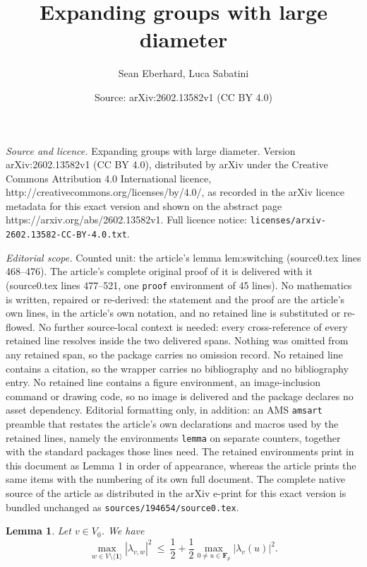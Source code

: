 \documentclass[10pt,a4paper]{amsart}
\title{Expanding groups with large diameter}
\author{Sean Eberhard, Luca Sabatini}
\date{Source: arXiv:2602.13582v1 (CC BY 4.0)}
\newtheorem{lemma}{Lemma}
\newcommand{\F}{\mathbf{F}}
\newcommand{\gen}[1]{\langle{#1}\rangle}
\def\one{\mathbf{1}}
\begin{document}
\maketitle

\noindent\emph{Source and licence.} Expanding groups with large diameter. Version arXiv:2602.13582v1 (CC BY 4.0), distributed by arXiv under the Creative Commons Attribution 4.0 International licence, http://creativecommons.org/licenses/by/4.0/, as recorded in the arXiv licence metadata for this exact version and shown on the abstract page https://arxiv.org/abs/2602.13582v1. Full licence notice: \texttt{licenses/arxiv-2602.13582-CC-BY-4.0.txt}.\par\smallskip

\noindent\textit{Editorial scope.} Counted unit: the article's lemma lem:switching (source0.tex lines 468--476). The article's complete original proof of it is delivered with it (source0.tex lines 477--521, one \texttt{proof} environment of 45 lines). No mathematics is written, repaired or re-derived: the statement and the proof are the article's own lines, in the article's own notation, and no retained line is substituted or re-flowed.  No further source-local context is needed: every cross-reference of every retained line resolves inside the two delivered spans.  Nothing was omitted from any retained span, so the package carries no omission record.  No retained line contains a citation, so the wrapper carries no bibliography and no bibliography entry.  No retained line contains a figure environment, an image-inclusion command or drawing code, so no image is delivered and the package declares no asset dependency.  Editorial formatting only, in addition: an AMS \texttt{amsart} preamble that restates the article's own declarations and macros used by the retained lines, namely the environments \texttt{lemma} on separate counters, together with the standard packages those lines need.  The retained environments print in this document as Lemma 1 in order of appearance, whereas the article prints the same items with the numbering of its own full document.  The complete native source of the article as distributed in the arXiv e-print for this exact version is bundled unchanged as \texttt{sources/194654/source0.tex}.
\begin{lemma}
    \label{lem:switching}
    Let $v \in V_0$. We have
    \[
       \max_{w \in V \setminus \gen\one} |\lambda_{v, w}|^2
       \> \le \>
       \frac12 + \frac12 \max_{0 \ne u \in \F_p} |\lambda_v(u)|^2.
    \]
\end{lemma}
\end{document}
